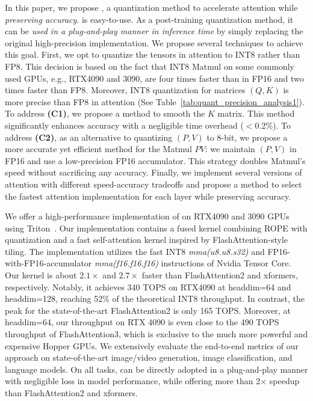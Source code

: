 In this paper, we propose \our, a quantization method to accelerate attention while \emph{preserving accuracy}. \our is easy-to-use. As a post-training quantization method, it can be \emph{used in a plug-and-play manner in inference time} by simply replacing the original high-precision implementation. We propose several techniques to achieve this goal. 
First, we opt to quantize the tensors in attention to INT8 rather than FP8. This decision is based on the fact that INT8 Matmul on some commonly used GPUs, e.g., RTX4090 and 3090, are four times faster than in FP16 and two times faster than FP8. Moreover, INT8 quantization for matrices $(Q, K)$ is more precise than FP8 in attention (See Table~\ref{tab:quant_precision_analysis1}).
To address \textbf{(C1)}, we propose a method to smooth the $K$ matrix. This method significantly enhances accuracy with a negligible time overhead ($<$0.2\%). 
To address \textbf{(C2)}, as an alternative to quantizing $(P, V)$ to 8-bit, we propose a more accurate yet efficient method for the Matmul $PV$: we maintain $(P, V)$ in FP16 and use a low-precision FP16 accumulator. This strategy doubles Matmul's speed without sacrificing any accuracy.
Finally, we implement several versions of attention with different speed-accuracy tradeoffs and propose a method to select the fastest attention implementation for each layer while preserving accuracy. 

We offer a high-performance implementation of \our on RTX4090 and 3090 GPUs using Triton~\citep{openaitriton}. Our implementation contains a fused kernel combining ROPE with quantization and a fast self-attention kernel inspired by FlashAttention-style tiling. The implementation utilizes the fast INT8 \emph{mma(u8.u8.s32)} and FP16-with-FP16-accumulator \emph{mma(f16.f16.f16)} instructions of Nvidia Tensor Core.
Our kernel is about $2.1 \times$ and $2.7 \times$ faster than FlashAttention2 and xformers, respectively.
Notably, it achieves 340 TOPS on RTX4090 at headdim=64 and headdim=128, reaching 52\% of the theoretical INT8 throughput. In contrast, the peak for the state-of-the-art FlashAttention2 is only 165 TOPS. Moreover, at headdim=64, our throughput on RTX 4090 is even close to the 490 TOPS throughput of FlashAttention3, which is exclusive to the much more powerful and expensive Hopper GPUs.
We extensively evaluate the end-to-end metrics of our approach on state-of-the-art image/video generation, image classification, and language models. On all tasks, \our can be directly adopted in a plug-and-play manner with negligible loss in model performance, while offering more than 2$\times$ speedup than FlashAttention2 and xformers.

